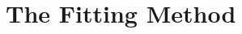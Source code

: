 \documentclass[ms.tex]{subfiles}
\begin{document}
\begin{itemize}



\end{itemize}


\section{The Fitting Method}
\label{sec:fitting}
\end{document}
